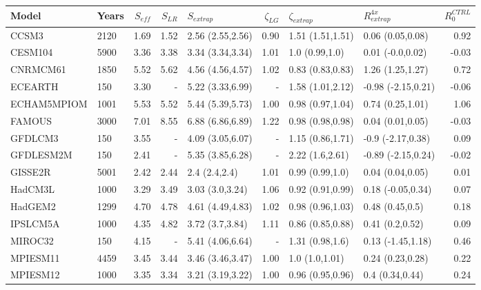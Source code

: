 \documentclass[esd, article]{copernicus}
\begin{document}
\begin{table}[t]
\small
\begin{tabular}{llrrlrllr}
\toprule
       Model & Years &  $S_{eff}$ &  $S_{LR}$ &       $S_{extrap}$ & $\zeta_{LG}$ &   $\zeta_{extrap}$ &    $R^{4x}_{extrap}$ & $R^{CTRL}_0$ \\
\midrule
       CCSM3 &  2120 &       1.69 &      1.52 &  2.56 (2.55,2.56) &    0.90 &  1.51 (1.51,1.51) &    0.06 (0.05,0.08) &         0.92 \\
     CESM104 &  5900 &       3.36 &      3.38 &  3.34 (3.34,3.34) &    1.01 &    1.0 (0.99,1.0) &    0.01 (-0.0,0.02) &        -0.03 \\
    CNRMCM61 &  1850 &       5.52 &      5.62 &  4.56 (4.56,4.57) &    1.02 &  0.83 (0.83,0.83) &    1.26 (1.25,1.27) &         0.72 \\
     ECEARTH &   150 &       3.30 &         - &  5.22 (3.33,6.99) &       - &  1.58 (1.01,2.12) &  -0.98 (-2.15,0.21) &        -0.06 \\
 ECHAM5MPIOM &  1001 &       5.53 &      5.52 &  5.44 (5.39,5.73) &    1.00 &  0.98 (0.97,1.04) &    0.74 (0.25,1.01) &         1.06 \\
      FAMOUS &  3000 &       7.01 &      8.55 &  6.88 (6.86,6.89) &    1.22 &  0.98 (0.98,0.98) &    0.04 (0.01,0.05) &        -0.03 \\
     GFDLCM3 &   150 &       3.55 &         - &  4.09 (3.05,6.07) &       - &  1.15 (0.86,1.71) &   -0.9 (-2.17,0.38) &         0.09 \\
   GFDLESM2M &   150 &       2.41 &         - &  5.35 (3.85,6.28) &       - &   2.22 (1.6,2.61) &  -0.89 (-2.15,0.24) &        -0.02 \\
     GISSE2R &  5001 &       2.42 &      2.44 &     2.4 (2.4,2.4) &    1.01 &   0.99 (0.99,1.0) &    0.04 (0.04,0.05) &         0.01 \\
     HadCM3L &  1000 &       3.29 &      3.49 &   3.03 (3.0,3.24) &    1.06 &  0.92 (0.91,0.99) &   0.18 (-0.05,0.34) &         0.07 \\
     HadGEM2 &  1299 &       4.70 &      4.78 &  4.61 (4.49,4.83) &    1.02 &  0.98 (0.96,1.03) &     0.48 (0.45,0.5) &         0.18 \\
    IPSLCM5A &  1000 &       4.35 &      4.82 &   3.72 (3.7,3.84) &    1.11 &  0.86 (0.85,0.88) &     0.41 (0.2,0.52) &         0.09 \\
     MIROC32 &   150 &       4.15 &         - &  5.41 (4.06,6.64) &       - &   1.31 (0.98,1.6) &   0.13 (-1.45,1.18) &         0.46 \\
    MPIESM11 &  4459 &       3.45 &      3.44 &  3.46 (3.46,3.47) &    1.00 &    1.0 (1.0,1.01) &    0.24 (0.23,0.28) &         0.22 \\
    MPIESM12 &  1000 &       3.35 &      3.34 &  3.21 (3.19,3.22) &    1.00 &  0.96 (0.95,0.96) &     0.4 (0.34,0.44) &         0.24 \\
\bottomrule
\end{tabular}
\label{tbl:LRMIP}

\end{table}
\end{document}

